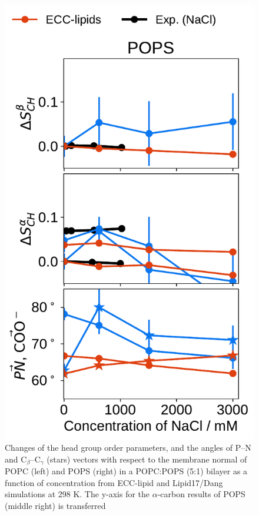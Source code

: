 \documentclass[journal=jpcbfk,manuscript=article]{achemso}
\newlength{\figheight}
\begin{document}
\begin{figure}[tbp!]
  \includegraphics[height=\figheight]{../img/ecc_pops/order_parameters_changes_ecc-lip_L14_A-B-PN-COO_POPS_nacl.pdf} 
  \caption{\label{fig:delta_ordPar_NaCl_PCPS} 
    Changes of the head group order parameters, and the angles of P--N and C$_\beta$--C$_\gamma$ (stars) vectors
    with respect to the membrane normal of POPC (left) and POPS (right) in a POPC:POPS (5:1) bilayer 
    as a function of  concentration from ECC-lipid and Lipid17/Dang simulations at 298 K.
    The y-axis for the $\alpha$-carbon results of POPS (middle right) is transferred
}
\end{figure}
\end{document}
